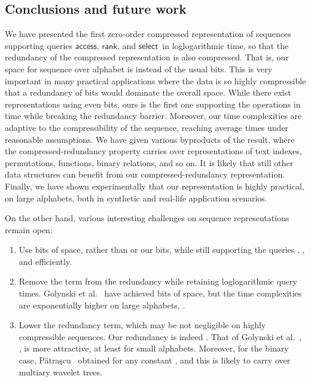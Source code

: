 \documentclass[11pt]{article}
\newcommand{\access}
    {\ensuremath{\mathsf{access}}}
\newcommand{\rank}
    {\ensuremath{\mathsf{rank}}}
\newcommand{\select}
    {\ensuremath{\mathsf{select}}}
\begin{document}
\begin{table}[t]
{\begin{tabular}
\section{Conclusions and future work}

We have presented the first zero-order compressed representation of sequences
supporting queries \access, \rank, and \select\ in loglogarithmic time, so that 
the
redundancy of the compressed representation is also compressed. That is, our
space for sequence  over alphabet  is  instead of the usual  bits.
This is very important in many practical applications where the data is so
highly compressible that a redundancy of  bits would dominate 
the overall space. While there exist representations using even  
bits, ours is the first one supporting the operations in time
 while breaking the  redundancy barrier.
Moreover, our time complexities are adaptive to the compressibility of the
sequence, reaching average times  under reasonable
assumptions. We have given various byproducts of the result, where the 
compressed-redundancy property carries over representations of text indexes,
permutations, functions, binary relations, and so on. It is likely that still 
other data structures can benefit from our compressed-redundancy representation.
Finally, we have shown experimentally that our representation is highly 
practical, on large alphabets, both in synthetic and real-life application 
scenarios.

\medskip

On the other hand, various interesting challenges on sequence representations
remain open:
\begin{enumerate}
\item Use  bits of space, rather than
 \cite{BHMR07,GOR10} or our
 bits, while still supporting the queries 
, , and  efficiently. 
\item Remove the  term from the redundancy while retaining
loglogarithmic query times. Golynski et al.~\cite{GRR08} have achieved 
 bits of space, but the time complexities are exponentially
higher on large alphabets, .
\item Lower the  redundancy term, which may be not negligible on 
highly compressible sequences.
Our  redundancy is indeed .
That of Golynski et al.~\cite{GRR08}, ,
is more attractive, at least for small alphabets. Moreover, for the binary 
case, P\u{a}tra\c{s}cu~\cite{Pat08} obtained  for any 
constant , and this is likely to carry over multiary wavelet trees.
\end{enumerate}


\end{tabular}}
\end{table}
\end{document}
